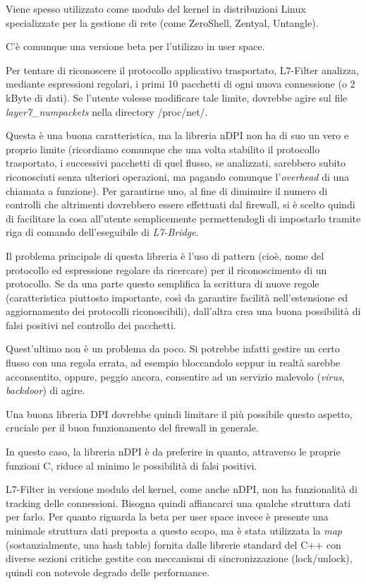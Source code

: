 Viene spesso utilizzato come modulo del kernel in distribuzioni Linux specializzate per la gestione di rete (come ZeroShell, Zentyal, Untangle).

C'è comunque una versione beta per l'utilizzo in user space.

Per tentare di riconoscere il protocollo applicativo trasportato, L7-Filter analizza, mediante espressioni regolari, i primi 10 pacchetti di ogni nuova connessione (o  2 kByte di dati). Se l'utente volesse modificare tale limite, dovrebbe agire sul file \emph{layer7\_numpackets} nella directory \mbox{/proc/net/}.

Questa è una buona caratteristica, ma la libreria nDPI non ha di suo un vero e proprio limite (ricordiamo comunque che una volta stabilito il protocollo trasportato, i successivi pacchetti di quel flusso, se analizzati, sarebbero subito riconosciuti senza ulteriori operazioni, ma pagando comunque l'\emph{overhead} di una chiamata a funzione). Per garantirne uno, al fine di diminuire il numero di controlli che altrimenti dovrebbero essere effettuati dal firewall, si è scelto quindi di facilitare la cosa all'utente semplicemente permettendogli di impostarlo tramite riga di comando dell'eseguibile di \emph{L7-Bridge}.

Il problema principale di questa libreria è l'uso di pattern (cioè, nome del protocollo ed espressione regolare da ricercare) per il riconoscimento di un protocollo. Se da una parte questo semplifica la scrittura di nuove regole (caratteristica piuttosto importante, così da garantire facilità nell'estensione ed aggiornamento dei protocolli riconoscibili), dall'altra crea una buona possibilità di falsi positivi nel controllo dei pacchetti.

Quest'ultimo non è un problema da poco. Si potrebbe infatti gestire un certo flusso con una regola errata, ad esempio bloccandolo seppur in realtà sarebbe acconsentito, oppure, peggio ancora, consentire ad un servizio malevolo (\emph{virus}, \emph{backdoor}) di agire.

Una buona libreria DPI dovrebbe quindi limitare il più possibile questo aspetto, cruciale per il buon funzionamento del firewall in generale.

In questo caso, la libreria nDPI è da preferire in quanto, attraverso le proprie funzioni C, riduce al minimo le possibilità di falsi positivi.

L7-Filter in versione modulo del kernel, come anche nDPI, non ha funzionalità di tracking delle connessioni. Bisogna quindi affiancarci una qualche struttura dati per farlo. Per quanto riguarda la beta per user space invece è presente una minimale struttura dati preposta a questo scopo, ma è stata utilizzata la \emph{map} (sostanzialmente, una hash table) fornita dalle librerie standard del C++ con diverse sezioni critiche gestite con meccanismi di sincronizzazione (lock/unlock), quindi con notevole degrado delle performance.

